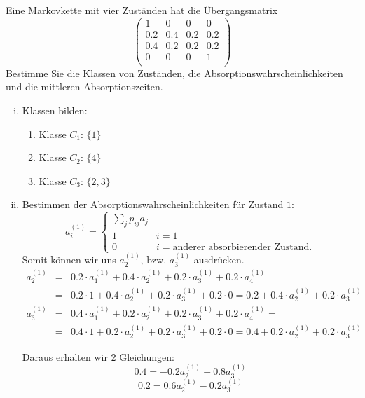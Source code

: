 \documentclass{scrreprt}
\begin{document}
\begin{uebsp}
\begin{Exercise}[label=ex:1.2]
    Eine Markovkette mit vier Zuständen hat die Übergangsmatrix
    \[\left(\begin{array}{cccc}
        1 & 0 & 0 & 0\\
        0.2 & 0.4 & 0.2 & 0.2\\
        0.4 & 0.2 & 0.2 & 0.2\\
        0 & 0 & 0 & 1\\
    \end{array}\right)\]
    Bestimme Sie die Klassen von Zuständen, die Absorptionswahrscheinlichkeiten und die mittleren Absorptionszeiten.
\end{Exercise}
\begin{Answer}
\begin{enumerate}[i)]
    \item Klassen bilden:
        \begin{enumerate}[1)]
            \item Klasse $C_1$: $\{1\}$
            \item Klasse $C_2$: $\{4\}$
            \item Klasse $C_3$: $\{2,3\}$
        \end{enumerate}
    \item Bestimmen der Absorptionswahrscheinlichkeiten für Zustand $1$:
        \[a_i^{(1)}=\begin{cases}\sum_jp_{ij}a_j\\1&i=1\\0&i=\text{anderer absorbierender Zustand.}\end{cases}\]
        Somit können wir uns $a_2^{(1)}$, bzw. $a_3^{(1)}$ ausdrücken.
        \begin{eqnarray*}
            a_2^{(1)} &=& 0.2\cdot a_1^{(1)} + 0.4\cdot a_2^{(1)} + 0.2\cdot a_3^{(1)} + 0.2\cdot a_4^{(1)}\\
                &=&0.2\cdot 1 + 0.4\cdot a_2^{(1)} + 0.2\cdot a_3^{(1)} + 0.2\cdot 0=0.2 + 0.4\cdot a_2^{(1)} + 0.2\cdot a_3^{(1)}\\
            a_3^{(1)} &=& 0.4\cdot a_1^{(1)} + 0.2\cdot a_2^{(1)} + 0.2\cdot a_3^{(1)} + 0.2\cdot a_4^{(1)}=\\
                &=&0.4\cdot 1 + 0.2\cdot a_2^{(1)} + 0.2\cdot a_3^{(1)} + 0.2\cdot 0=0.4 + 0.2\cdot a_2^{(1)} + 0.2\cdot a_3^{(1)}
        \end{eqnarray*}

        Daraus erhalten wir 2 Gleichungen:
        \[0.4=-0.2a_2^{(1)}+0.8a_3^{(1)}\]
        \[0.2=0.6a_2^{(1)}-0.2a_3^{(1)}\]


\end{enumerate}
\end{Answer}
\end{uebsp}
\end{document}
